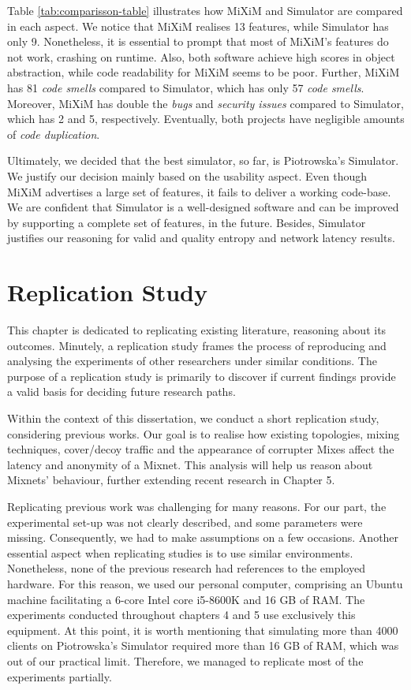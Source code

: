 \documentclass[logo,msc,cyber]{infthesis}   %
\begin{document}
Table \ref{tab:comparisson-table} illustrates how MiXiM and Simulator are
compared in each aspect. We notice that MiXiM realises 13 features, while
Simulator has only 9. Nonetheless, it is essential to prompt that most of
MiXiM's features do not work, crashing on runtime. Also, both software achieve
high scores in object abstraction, while code readability for MiXiM seems to be
poor. Further, MiXiM has 81 \emph{code smells} compared to Simulator, which  has
only 57 \emph{code smells}. Moreover, MiXiM has double the \emph{bugs} and
\emph{security issues} compared to Simulator, which has 2 and 5, respectively.
Eventually, both projects have negligible amounts of \emph{code duplication}.

Ultimately, we decided that the best simulator, so far, is Piotrowska's
Simulator. We justify our decision mainly based on the usability aspect. Even
though MiXiM advertises a large set of features, it fails to deliver a working
code-base. We are confident that Simulator is a well-designed software and can
be improved by supporting a complete set of features, in the future. Besides,
Simulator justifies our reasoning for valid and quality entropy and network
latency results. 

\chapter{Replication Study}
This chapter is dedicated to replicating existing
literature\cite{piotrowska2021studying,ben2021mixim}, reasoning about its
outcomes. Minutely, a replication study frames the process of reproducing and
analysing the experiments of other researchers under similar conditions. The
purpose of a replication study is primarily to discover if current findings
provide a valid basis for deciding future research paths.

Within the context of this dissertation, we conduct a short replication study,
considering previous works\cite{piotrowska2021studying,ben2021mixim}. Our goal
is to realise how existing topologies, mixing techniques, cover/decoy traffic
and the appearance of corrupter Mixes affect the latency and anonymity of a
Mixnet. This analysis will help us reason about Mixnets' behaviour, further
extending recent research in Chapter 5.

Replicating previous work was challenging for many reasons. For our part, the
experimental set-up was not clearly described, and some parameters were missing.
Consequently, we had to make assumptions on a few occasions. Another essential
aspect when replicating studies is to use similar environments. Nonetheless,
none of the previous research had references to the employed hardware. For this
reason, we used our personal computer, comprising an Ubuntu machine facilitating
a 6-core Intel core i5-8600K and 16 GB of RAM. The experiments conducted
throughout chapters 4 and 5 use exclusively this equipment. At this point, it is
worth mentioning that simulating more than 4000 clients on Piotrowska's
Simulator required more than 16 GB of RAM, which was out of our practical limit.
Therefore, we managed to replicate most of the experiments partially. 
\end{document}
